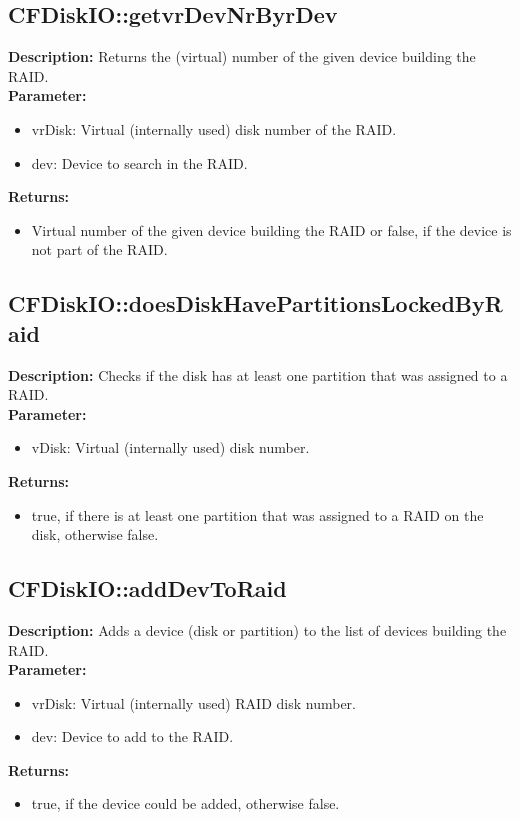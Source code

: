 \subsection{CFDiskIO::getvrDevNrByrDev}
\textbf{Description:} Returns the (virtual) number of the given device building the RAID.\\
\textbf{Parameter:}
\begin{itemize}
\item vrDisk: Virtual (internally used) disk number of the RAID.
\item dev: Device to search in the RAID.
\end{itemize}
\textbf{Returns:}
\begin{itemize}
\item Virtual number of the given device building the RAID or false, if the device is not part of the RAID.
\end{itemize}

\subsection{CFDiskIO::doesDiskHavePartitionsLockedByRaid}
\textbf{Description:} Checks if the disk has at least one partition that was assigned to a RAID.\\
\textbf{Parameter:}
\begin{itemize}
\item vDisk: Virtual (internally used) disk number.
\end{itemize}
\textbf{Returns:}
\begin{itemize}
\item true, if there is at least one partition that was assigned to a RAID on the disk, otherwise false.
\end{itemize}

\subsection{CFDiskIO::addDevToRaid}
\textbf{Description:} Adds a device (disk or partition) to the list of devices building the RAID.\\
\textbf{Parameter:}
\begin{itemize}
\item vrDisk: Virtual (internally used) RAID disk number.
\item dev: Device to add to the RAID.
\end{itemize}
\textbf{Returns:}
\begin{itemize}
\item true, if the device could be added, otherwise false.
\end{itemize}

